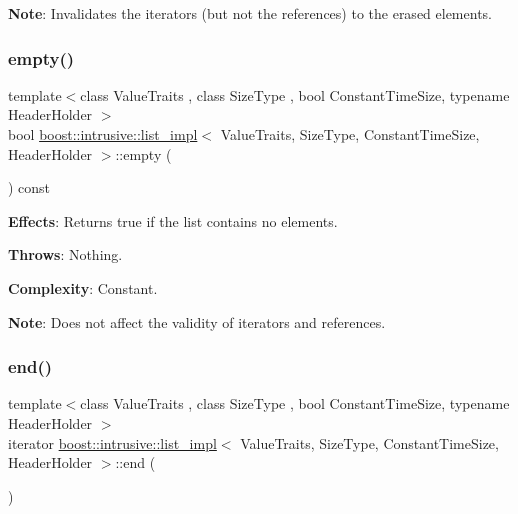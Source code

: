 {\bfseries Note}\+: Invalidates the iterators (but not the references) to the erased elements. \mbox{\label{classboost_1_1intrusive_1_1list__impl_afe2d286a6230f944fe3aa5a231d01e0a}} 
\subsubsection{\texorpdfstring{empty()}{empty()}}
{\footnotesize\ttfamily template$<$class Value\+Traits , class Size\+Type , bool Constant\+Time\+Size, typename Header\+Holder $>$ \\
bool \hyperlink{classboost_1_1intrusive_1_1list__impl}{boost\+::intrusive\+::list\+\_\+impl}$<$ Value\+Traits, Size\+Type, Constant\+Time\+Size, Header\+Holder $>$\+::empty (\begin{DoxyParamCaption}{ }\end{DoxyParamCaption}) const\hspace{0.3cm}{\ttfamily [inline]}}

{\bfseries Effects}\+: Returns true if the list contains no elements.

{\bfseries Throws}\+: Nothing.

{\bfseries Complexity}\+: Constant.

{\bfseries Note}\+: Does not affect the validity of iterators and references. \mbox{\label{classboost_1_1intrusive_1_1list__impl_af2a454471fced6d4b2fb899c50bbee67}} 
\subsubsection{\texorpdfstring{end()}{end()}\hspace{0.1cm}{\footnotesize\ttfamily [1/2]}}
{\footnotesize\ttfamily template$<$class Value\+Traits , class Size\+Type , bool Constant\+Time\+Size, typename Header\+Holder $>$ \\
iterator \hyperlink{classboost_1_1intrusive_1_1list__impl}{boost\+::intrusive\+::list\+\_\+impl}$<$ Value\+Traits, Size\+Type, Constant\+Time\+Size, Header\+Holder $>$\+::end (\begin{DoxyParamCaption}{ }\end{DoxyParamCaption})\hspace{0.3cm}{\ttfamily [inline]}}

